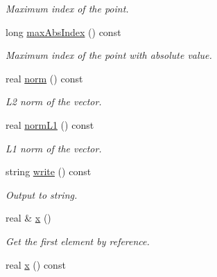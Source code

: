 \begin{DoxyCompactItemize}
\begin{DoxyCompactList}\small\item\em \-Maximum index of the point. \end{DoxyCompactList}\item 
\hypertarget{class_point_a5b06a3b1249d1a29e316b00e94522a5a}{long \hyperlink{class_point_a5b06a3b1249d1a29e316b00e94522a5a}{max\-Abs\-Index} () const }\label{class_point_a5b06a3b1249d1a29e316b00e94522a5a}

\begin{DoxyCompactList}\small\item\em \-Maximum index of the point with absolute value. \end{DoxyCompactList}\item 
\hypertarget{class_point_a885ede7e456888ddb73792df46f88513}{real \hyperlink{class_point_a885ede7e456888ddb73792df46f88513}{norm} () const }\label{class_point_a885ede7e456888ddb73792df46f88513}

\begin{DoxyCompactList}\small\item\em \-L2 norm of the vector. \end{DoxyCompactList}\item 
\hypertarget{class_point_a6a5c8172bed4fadd3ff4369ac24b627e}{real \hyperlink{class_point_a6a5c8172bed4fadd3ff4369ac24b627e}{norm\-L1} () const }\label{class_point_a6a5c8172bed4fadd3ff4369ac24b627e}

\begin{DoxyCompactList}\small\item\em \-L1 norm of the vector. \end{DoxyCompactList}\item 
string \hyperlink{class_point_a2e471acd2e526217306b148ef5d04d87}{write} () const 
\begin{DoxyCompactList}\small\item\em \-Output to string. \end{DoxyCompactList}\item 
\hypertarget{class_point_ad9c36be87662ac8b290800ff76b8a3f7}{real \& \hyperlink{class_point_ad9c36be87662ac8b290800ff76b8a3f7}{x} ()}\label{class_point_ad9c36be87662ac8b290800ff76b8a3f7}

\begin{DoxyCompactList}\small\item\em \-Get the first element by reference. \end{DoxyCompactList}\item 
\hypertarget{class_point_a155238f2303c1805a976e5ffde2df863}{real \hyperlink{class_point_a155238f2303c1805a976e5ffde2df863}{x} () const }\label{class_point_a155238f2303c1805a976e5ffde2df863}


\end{DoxyCompactItemize}
